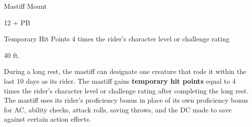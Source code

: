 \documentclass[letterpaper,twocolumn,openany,nodeprecatedcode]{dndbook}
\begin{document}
\begin{DndMonster}[float*=b,width=\textwidth + 8pt]{Mastiff Mount}
  \begin{multicols}{2}

    \DndMonsterLine
    \begin {CustomBasics}
      \item[\armorclassname] 12 + PB
      \item[Temporary Hit Points] 4 times the rider's character level or challenge rating
      \item[\hitpointsname]  
      \item[\speedname] 40 ft.
    \end {CustomBasics}
    \DndMonsterLine

    \DndMonsterAbilityScores[
        str = 13,
        dex = 14,
        con = 12,
        int = 3,
        wis = 12,
        cha = 7,
      ]

    \DndMonsterDetails[
        skills = {Perception +1 + PB},
        senses = {passive Perception 13},
        languages = {-},
        challenge = 1/8,
      ]

    During a long rest, the mastiff can designate one creature that rode it within the last 10 days as its rider. The mastiff gains \textbf{temporary hit points} equal to 4 times the rider’s character level or challenge rating after completing the long rest. The mastiff uses its rider’s proficiency bonus in place of its own proficiency bonus for AC, ability checks, attack rolls, saving throws, and the DC made to save against certain action effects.


    \DndMonsterAttack[
      name=Bite,
      distance=melee, %
      mod={+1 + PB},
      dmg=\DndDice{2d4 + 1},
      dmg-type=piercing,
      extra={. If the target is a Medium or smaller creature, it must succeed on a DC 9 + PB Strength saving throw or be knocked prone}
    ]


\end{multicols}
\end{DndMonster}
\end{document}
